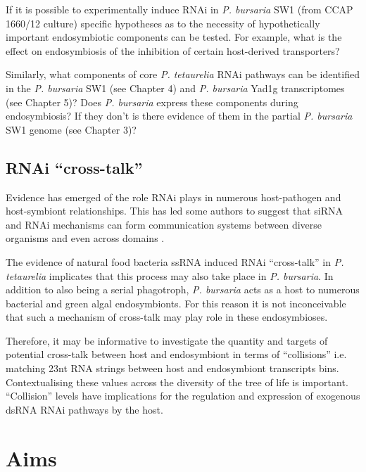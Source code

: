If it is possible to experimentally induce RNAi in \textit{P. bursaria} SW1 (from CCAP 1660/12 culture)
specific hypotheses as to the necessity of hypothetically important
endosymbiotic components can be tested. For example, what is the effect
on endosymbiosis of the inhibition of certain host-derived transporters?

Similarly, what components of core \textit{P. tetaurelia} RNAi pathways
can be identified 
in the \textit{P. bursaria} SW1 (see Chapter 4) and \textit{P. bursaria} Yad1g transcriptomes
(see Chapter 5)?  Does \textit{P. bursaria} express these components during
endosymbiosis?  If they don't is there evidence of them in the partial 
\textit{P. bursaria} SW1 genome (see Chapter 3)?


\subsection{RNAi ``cross-talk''}
Evidence has emerged of the role RNAi plays in numerous host-pathogen 
\citep{Nowara2010,LaMonte2012,Weiberg2013,Buck2014}
and host-symbiont \citep{Helber2011,Koch2013} relationships.
This has led some authors to suggest that siRNA and RNAi mechanisms 
can form communication systems between diverse organisms and even across
domains \citep{Liang2013,Knip2014,Weiberg2015}.


The evidence of natural food bacteria ssRNA induced RNAi ``cross-talk''
in \textit{P. tetaurelia} \citep{Carradec2015} implicates
that this process may also take place in \textit{P. bursaria}.
In addition to also being a serial phagotroph, \textit{P. bursaria}
acts as a host to numerous bacterial and green algal endosymbionts.
For this reason it is not inconceivable that such a mechanism of 
cross-talk may play role in these endosymbioses.


Therefore, it may be informative to investigate the quantity and targets of
potential cross-talk between host and endosymbiont in terms of 
``collisions''  i.e. matching 23nt RNA strings between host and endosymbiont
transcripts bins.   Contextualising these values 
across the diversity of the tree of life is important.
``Collision'' levels have implications for the regulation and expression of exogenous dsRNA
RNAi pathways by the host. 


\section{Aims}

